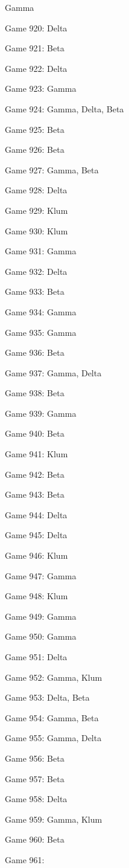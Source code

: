 \documentclass{article}
\begin{document}
\begin{multicols}{3}
\begin{compactitem}
Gamma
\item Game 920:
Delta
\item Game 921:
Beta
\item Game 922:
Delta
\item Game 923:
Gamma
\item Game 924:
Gamma, Delta, Beta
\item Game 925:
Beta
\item Game 926:
Beta
\item Game 927:
Gamma, Beta
\item Game 928:
Delta
\item Game 929:
Klum
\item Game 930:
Klum
\item Game 931:
Gamma
\item Game 932:
Delta
\item Game 933:
Beta
\item Game 934:
Gamma
\item Game 935:
Gamma
\item Game 936:
Beta
\item Game 937:
Gamma, Delta
\item Game 938:
Beta
\item Game 939:
Gamma
\item Game 940:
Beta
\item Game 941:
Klum
\item Game 942:
Beta
\item Game 943:
Beta
\item Game 944:
Delta
\item Game 945:
Delta
\item Game 946:
Klum
\item Game 947:
Gamma
\item Game 948:
Klum
\item Game 949:
Gamma
\item Game 950:
Gamma
\item Game 951:
Delta
\item Game 952:
Gamma, Klum
\item Game 953:
Delta, Beta
\item Game 954:
Gamma, Beta
\item Game 955:
Gamma, Delta
\item Game 956:
Beta
\item Game 957:
Beta
\item Game 958:
Delta
\item Game 959:
Gamma, Klum
\item Game 960:
Beta
\item Game 961:

\end{compactitem}
\end{multicols}
\end{document}
